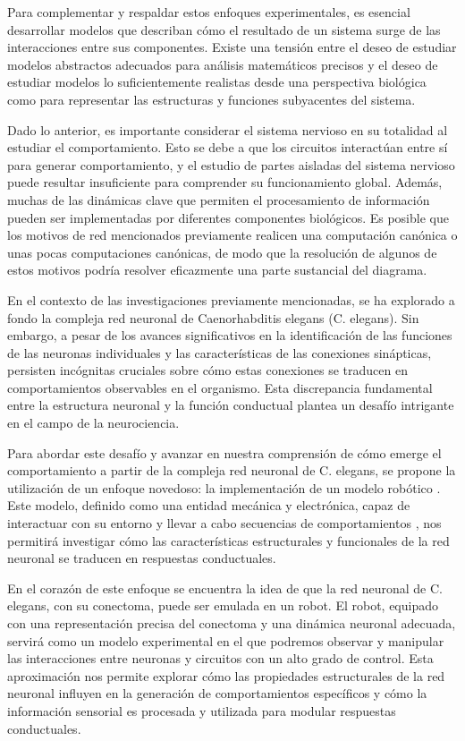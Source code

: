 Para complementar y respaldar estos enfoques experimentales, es esencial desarrollar modelos que describan cómo el resultado de un sistema surge de las interacciones entre sus componentes. Existe una tensión entre el deseo de estudiar modelos abstractos adecuados para análisis matemáticos precisos y el deseo de estudiar modelos lo suficientemente realistas desde una perspectiva biológica como para representar las estructuras y funciones subyacentes del sistema. 

Dado lo anterior, es importante considerar el sistema nervioso en su totalidad al estudiar el comportamiento. Esto se debe a que los circuitos interactúan entre sí para generar comportamiento, y el estudio de partes aisladas del sistema nervioso puede resultar insuficiente para comprender su funcionamiento global. Además, muchas de las dinámicas clave que permiten el procesamiento de información pueden ser implementadas por diferentes componentes biológicos. Es posible que los motivos de red mencionados previamente realicen una computación canónica o unas pocas computaciones canónicas, de modo que la resolución de algunos de estos motivos podría resolver eficazmente una parte sustancial del diagrama.

En el contexto de las investigaciones previamente mencionadas, se ha explorado a fondo la compleja red neuronal de Caenorhabditis elegans (C. elegans). Sin embargo, a pesar de los avances significativos en la identificación de las funciones de las neuronas individuales y las características de las conexiones sinápticas, persisten incógnitas cruciales sobre cómo estas conexiones se traducen en comportamientos observables en el organismo. Esta discrepancia fundamental entre la estructura neuronal y la función conductual plantea un desafío intrigante en el campo de la neurociencia.

Para abordar este desafío y avanzar en nuestra comprensión de cómo emerge el comportamiento a partir de la compleja red neuronal de C. elegans, se propone la utilización de un enfoque novedoso: la implementación de un modelo robótico . Este modelo, definido como una entidad mecánica y electrónica, capaz de interactuar con su entorno y llevar a cabo secuencias de comportamientos  \cite{brambilla_swarm_2013}, nos permitirá investigar cómo las características estructurales y funcionales de la red neuronal se traducen en respuestas conductuales.

En el corazón de este enfoque se encuentra la idea de que la red neuronal de C. elegans, con su conectoma, puede ser emulada en un robot. El robot, equipado con una representación precisa del conectoma y una dinámica neuronal adecuada, servirá como un modelo experimental en el que podremos observar y manipular las interacciones entre neuronas y circuitos con un alto grado de control. Esta aproximación nos permite explorar cómo las propiedades estructurales de la red neuronal influyen en la generación de comportamientos específicos y cómo la información sensorial es procesada y utilizada para modular respuestas conductuales.

